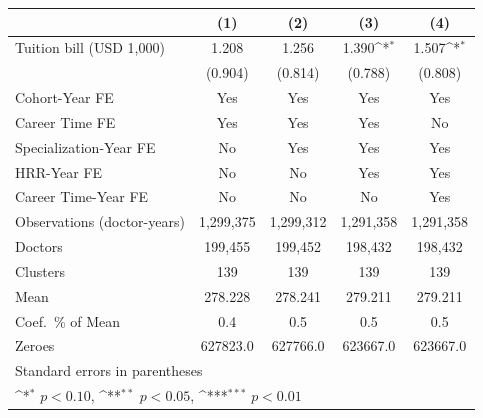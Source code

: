 {
\def\sym#1{\ifmmode^{#1}\else\(^{#1}\)\fi}
\begin{tabular}{l*{4}{c}}
\hline\hline
                    &\multicolumn{1}{c}{(1)}         &\multicolumn{1}{c}{(2)}         &\multicolumn{1}{c}{(3)}         &\multicolumn{1}{c}{(4)}         \\
\hline
Tuition bill (USD 1,000)&       1.208         &       1.256         &       1.390\sym{*}  &       1.507\sym{*}  \\
                    &     (0.904)         &     (0.814)         &     (0.788)         &     (0.808)         \\
[1em]
Cohort-Year FE      &         Yes         &         Yes         &         Yes         &         Yes         \\
[1em]
Career Time FE      &         Yes         &         Yes         &         Yes         &          No         \\
[1em]
Specialization-Year FE&          No         &         Yes         &         Yes         &         Yes         \\
[1em]
HRR-Year FE         &          No         &          No         &         Yes         &         Yes         \\
[1em]
Career Time-Year FE &          No         &          No         &          No         &         Yes         \\
\hline
Observations (doctor-years)&   1,299,375         &   1,299,312         &   1,291,358         &   1,291,358         \\
Doctors             &     199,455         &     199,452         &     198,432         &     198,432         \\
Clusters            &         139         &         139         &         139         &         139         \\
Mean                &     278.228         &     278.241         &     279.211         &     279.211         \\
Coef.\ \% of Mean   &         0.4         &         0.5         &         0.5         &         0.5         \\
Zeroes              &    627823.0         &    627766.0         &    623667.0         &    623667.0         \\
\hline\hline
\multicolumn{5}{l}{\footnotesize Standard errors in parentheses}\\
\multicolumn{5}{l}{\footnotesize \sym{*} \(p<0.10\), \sym{**} \(p<0.05\), \sym{***} \(p<0.01\)}\\
\end{tabular}
}
